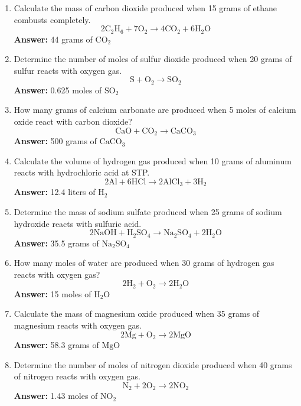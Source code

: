 \documentclass{article}
\begin{document}
\begin{enumerate}
    \item Calculate the mass of carbon dioxide produced when 15 grams of ethane combusts completely.
    \[
    2\text{C}_2\text{H}_6 + 7\text{O}_2 \rightarrow 4\text{CO}_2 + 6\text{H}_2\text{O}
    \]
    \textbf{Answer:} 44 grams of \(\text{CO}_2\)

    \item Determine the number of moles of sulfur dioxide produced when 20 grams of sulfur reacts with oxygen gas.
    \[
    \text{S} + \text{O}_2 \rightarrow \text{SO}_2
    \]
    \textbf{Answer:} 0.625 moles of \(\text{SO}_2\)

    \item How many grams of calcium carbonate are produced when 5 moles of calcium oxide react with carbon dioxide?
    \[
    \text{CaO} + \text{CO}_2 \rightarrow \text{CaCO}_3
    \]
    \textbf{Answer:} 500 grams of \(\text{CaCO}_3\)

    \item Calculate the volume of hydrogen gas produced when 10 grams of aluminum reacts with hydrochloric acid at STP.
    \[
    2\text{Al} + 6\text{HCl} \rightarrow 2\text{AlCl}_3 + 3\text{H}_2
    \]
    \textbf{Answer:} 12.4 liters of \(\text{H}_2\)

    \item Determine the mass of sodium sulfate produced when 25 grams of sodium hydroxide reacts with sulfuric acid.
    \[
    2\text{NaOH} + \text{H}_2\text{SO}_4 \rightarrow \text{Na}_2\text{SO}_4 + 2\text{H}_2\text{O}
    \]
    \textbf{Answer:} 35.5 grams of \(\text{Na}_2\text{SO}_4\)

    \item How many moles of water are produced when 30 grams of hydrogen gas reacts with oxygen gas?
    \[
    2\text{H}_2 + \text{O}_2 \rightarrow 2\text{H}_2\text{O}
    \]
    \textbf{Answer:} 15 moles of \(\text{H}_2\text{O}\)

    \item Calculate the mass of magnesium oxide produced when 35 grams of magnesium reacts with oxygen gas.
    \[
    2\text{Mg} + \text{O}_2 \rightarrow 2\text{MgO}
    \]
    \textbf{Answer:} 58.3 grams of \(\text{MgO}\)

    \item Determine the number of moles of nitrogen dioxide produced when 40 grams of nitrogen reacts with oxygen gas.
    \[
    \text{N}_2 + 2\text{O}_2 \rightarrow 2\text{NO}_2
    \]
    \textbf{Answer:} 1.43 moles of \(\text{NO}_2\)


\end{enumerate}
\end{document}
